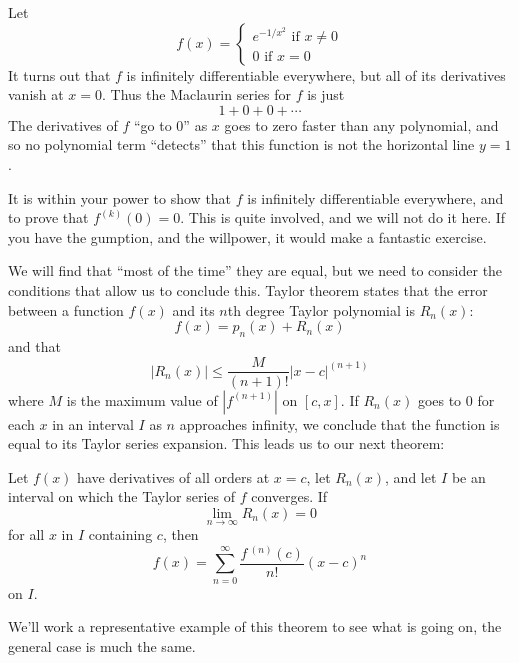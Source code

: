 \documentclass{ximera}
\begin{document}
\begin{example}  %
	Let 
	\[
	f(x) = \begin{cases}
		e^{-1/x^2} \textrm{ if $x \neq 0$}\\
		0 \textrm{ if $x = 0$}
	\end{cases}
	\]
	It turns out that $f$ is infinitely differentiable everywhere,
        but all of its derivatives vanish at $x=0$. Thus the Maclaurin series for $f$ is just
        \[
        1 + 0 + 0+ \cdots
        \]
        The derivatives of $f$ ``go to $0$'' as $x$ goes to zero
        faster than any polynomial, and so no polynomial term
        ``detects'' that this function is not the horizontal line
        $y=1$.

        It is within your power to show that $f$ is infinitely
        differentiable everywhere, and to prove that $f^{(k)}(0) = 0$.
        This is quite involved, and we will not do it here.  If you
        have the gumption, and the willpower, it would make a
        fantastic exercise.
\end{example}

We will find that ``most of the time'' they are equal, but we need to
consider the conditions that allow us to conclude this.  Taylor
theorem states that the error between a function $f(x)$ and its $n$th
degree Taylor polynomial is $R_n(x)$:
\[
f(x) = p_n(x) + R_n(x)
\]
and that 
\[
\left|R_n(x)\right| \leq \frac{M}{(n+1)!}|x-c|^{(n+1)}
\]
where $M$ is the maximum value of $|f^{(n+1)}|$ on $[c,x]$.  If
$R_n(x)$ goes to $0$ for each $x$ in an interval $I$ as $n$ approaches
infinity, we conclude that the function is equal to its Taylor series
expansion. This leads us to our next theorem:

\begin{theorem}
Let $f(x)$ have derivatives of all orders at $x=c$, let $R_n(x)$, and
let $I$ be an interval on which the Taylor series of $f$ converges.
If
\[
\lim_{n\to\infty} R_n(x) = 0
\]
for all $x$ in $I$ containing $c$, then
\[
f(x) = \sum_{n=0}^\infty \frac{f\,^{(n)}(c)}{n!}(x-c)^n
\]
on $I$.
\end{theorem}

We'll work a representative example of this theorem to see what is
going on, the general case is much the same.
\end{document}
